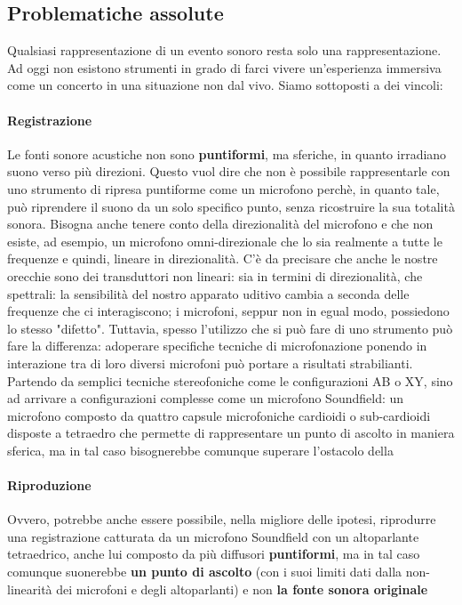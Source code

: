 	\subsection{Problematiche assolute}
	Qualsiasi rappresentazione di un evento sonoro resta solo una rappresentazione. Ad oggi non esistono strumenti in grado di farci vivere un'esperienza immersiva come un concerto in una situazione non dal vivo. Siamo sottoposti a dei vincoli:
	
	\paragraph{Registrazione} Le fonti sonore acustiche non sono \textbf{puntiformi}, ma sferiche, in quanto irradiano suono verso più direzioni. Questo vuol dire che non è possibile rappresentarle con uno strumento di ripresa puntiforme come un microfono perchè, in quanto tale, può riprendere il suono da un solo specifico punto, senza ricostruire la sua totalità sonora. Bisogna anche tenere conto della direzionalità del microfono e che non esiste, ad esempio, un microfono omni-direzionale che lo sia realmente a tutte le frequenze e quindi, lineare in direzionalità. C'è da precisare che anche le nostre orecchie sono dei transduttori non lineari: sia in termini di direzionalità, che spettrali: la sensibilità del nostro apparato uditivo cambia a seconda delle frequenze che ci interagiscono; i microfoni, seppur non in egual modo, possiedono lo stesso "difetto".
	Tuttavia, spesso l'utilizzo che si può fare di uno strumento può fare la differenza: adoperare specifiche tecniche di microfonazione ponendo in interazione tra di loro diversi microfoni può portare a risultati strabilianti. Partendo da semplici tecniche stereofoniche come  le configurazioni AB o XY, sino ad arrivare a configurazioni complesse come un microfono Soundfield: un microfono composto da quattro capsule microfoniche cardioidi o sub-cardioidi disposte a tetraedro che permette di rappresentare un punto di ascolto in maniera sferica, ma in tal caso bisognerebbe comunque superare l'ostacolo della
	
	\paragraph{Riproduzione} Ovvero, potrebbe anche essere possibile, nella migliore delle ipotesi, riprodurre una registrazione catturata da un microfono Soundfield con un altoparlante tetraedrico, anche lui composto da più diffusori \textbf{puntiformi}, ma in tal caso comunque suonerebbe \textbf{un punto di ascolto} (con i suoi limiti dati dalla non-linearità dei microfoni e degli altoparlanti) e non \textbf{la fonte sonora originale}
	
